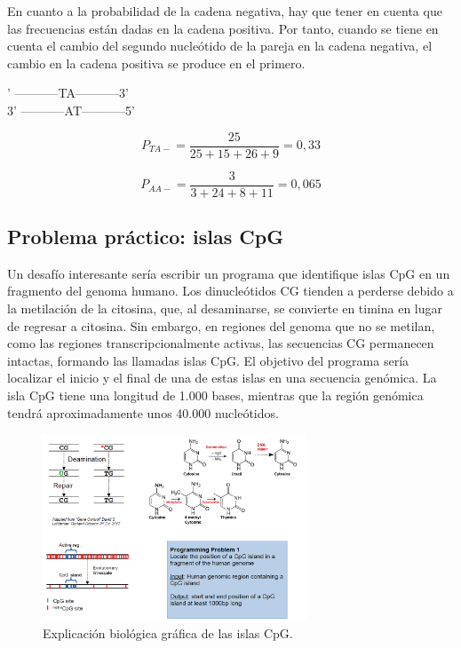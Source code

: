 En cuanto a la probabilidad de la cadena negativa, hay que tener en cuenta que las frecuencias están dadas en la cadena positiva. Por tanto, cuando se tiene en cuenta el cambio del segundo nucleótido de la pareja en la cadena negativa, el cambio en la cadena positiva se produce en el primero. \\

\begin{table}[htbp]
' -----------TA-----------3' \\
3' -----------AT-----------5' \\
\end{table}

$$P_{TA-} = \frac{25}{25 + 15 + 26 + 9} = 0,33 $$

$$P_{AA-} = \frac{3}{3 + 24 + 8 + 11} = 0,065 $$

\subsection{Problema práctico: islas CpG}
Un desafío interesante sería escribir un programa que identifique islas CpG en un fragmento del genoma humano. Los dinucleótidos CG tienden a perderse debido a la metilación de la citosina, que, al desaminarse, se convierte en timina en lugar de regresar a citosina. Sin embargo, en regiones del genoma que no se metilan, como las regiones transcripcionalmente activas, las secuencias CG permanecen intactas, formando las llamadas islas CpG. El objetivo del programa sería localizar el inicio y el final de una de estas islas en una secuencia genómica. La isla CpG tiene una longitud de 1.000 bases, mientras que la región genómica tendrá aproximadamente unos 40.000 nucleótidos.

\begin{figure}[htbp]
\centering
\includegraphics[width = 0.7\textwidth]{figs/cpg-islands.png}
\caption{Explicación biológica gráfica de las islas CpG. }
\end{figure}

